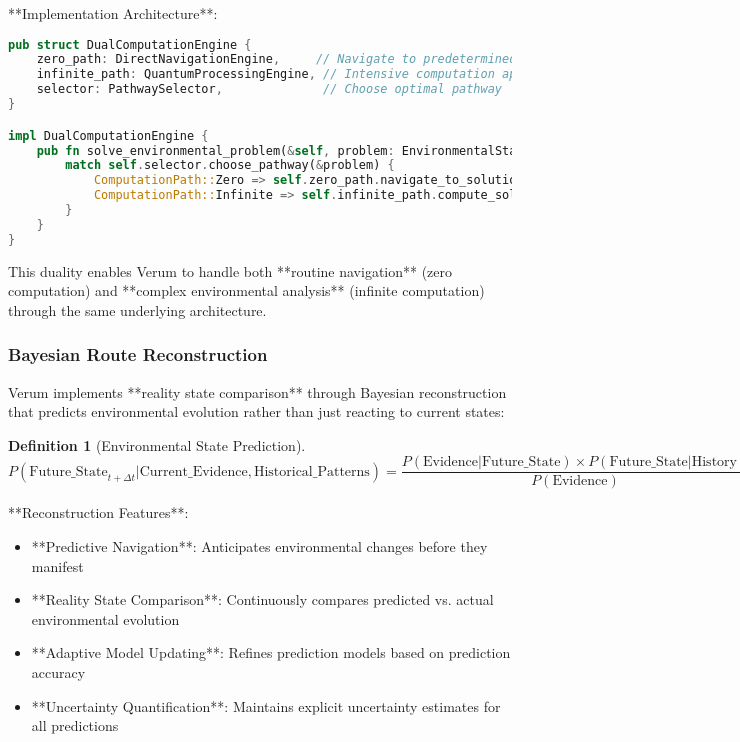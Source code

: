 \documentclass[12pt,a4paper]{article}
\newtheorem{definition}[theorem]{Definition}
\begin{document}
**Implementation Architecture**:
\begin{lstlisting}[language=Rust]
pub struct DualComputationEngine {
    zero_path: DirectNavigationEngine,     // Navigate to predetermined coordinates
    infinite_path: QuantumProcessingEngine, // Intensive computation approach
    selector: PathwaySelector,              // Choose optimal pathway
}

impl DualComputationEngine {
    pub fn solve_environmental_problem(&self, problem: EnvironmentalState) -> Solution {
        match self.selector.choose_pathway(&problem) {
            ComputationPath::Zero => self.zero_path.navigate_to_solution(problem),
            ComputationPath::Infinite => self.infinite_path.compute_solution(problem),
        }
    }
}
\end{lstlisting}

This duality enables Verum to handle both **routine navigation** (zero computation) and **complex environmental analysis** (infinite computation) through the same underlying architecture.

\subsubsection{Bayesian Route Reconstruction}

Verum implements **reality state comparison** through Bayesian reconstruction that predicts environmental evolution rather than just reacting to current states:

\begin{definition}[Environmental State Prediction]
$$P(\text{Future\_State}_{t+\Delta t} | \text{Current\_Evidence}, \text{Historical\_Patterns}) = \frac{P(\text{Evidence} | \text{Future\_State}) \times P(\text{Future\_State} | \text{History})}{P(\text{Evidence})}$$
\end{definition}

**Reconstruction Features**:
\begin{itemize}
\item **Predictive Navigation**: Anticipates environmental changes before they manifest
\item **Reality State Comparison**: Continuously compares predicted vs. actual environmental evolution
\item **Adaptive Model Updating**: Refines prediction models based on prediction accuracy
\item **Uncertainty Quantification**: Maintains explicit uncertainty estimates for all predictions
\end{itemize}
\end{document}

